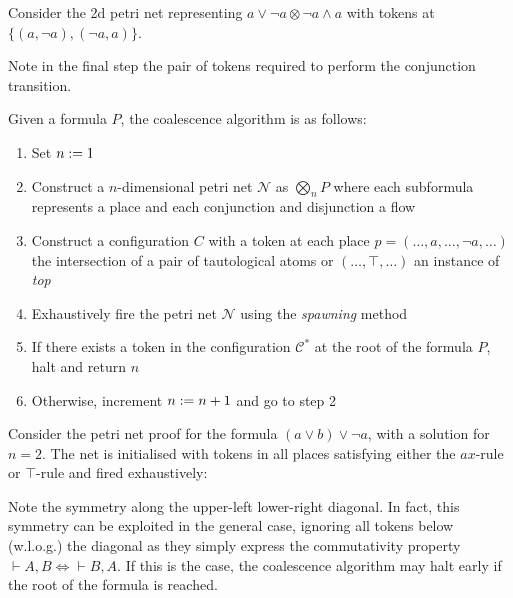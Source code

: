     \begin{example}
        Consider the 2d petri net representing $a \vee \neg a \otimes \neg a \wedge a$ with tokens at $\{(a, \neg a), (\neg a, a)\}$.
        
        Note in the final step the pair of tokens required to perform the conjunction transition.
    \end{example}


    \begin{definition}[Coalescence]
        Given a formula $P$, the coalescence algorithm is as follows:
        \begin{enumerate}[nosep]
            \item Set  $n := 1$
            \item Construct a $n$-dimensional petri net $\mathcal{N}$ as $\bigotimes_n P$ where each subformula represents a place and each conjunction and disjunction a flow
            \item Construct a configuration $C$ with a token at each place $p = (\ldots, a, \ldots, \neg a, \ldots)$ the intersection of a pair of tautological atoms or $(\ldots, \top, \ldots)$ an instance of \textit{top}
            \item Exhaustively fire the petri net $\mathcal{N}$ using the \textit{spawning} method
            \item If there exists a token in the configuration $\mathcal{C^*}$ at the root of the formula $P$, halt and return $n$
            \item Otherwise, increment $n := n + 1$ and go to step 2
        \end{enumerate}
    \end{definition}
    
    \begin{example}
        Consider the petri net proof for the formula $(a \vee b) \vee \neg a$, with a solution for $n = 2$.
        The net is initialised with tokens in all places satisfying either the $ax$-rule or $\top$-rule and fired exhaustively:
        
    \end{example}

    \begin{remark}\label{sec-ctr:symmetry}
        Note the symmetry along the upper-left lower-right diagonal.
        In fact, this symmetry can be exploited in the general case, ignoring all tokens below (w.l.o.g.) the diagonal as they simply express the commutativity property $\vdash A, B \iff \vdash B, A$.
        If this is the case, the coalescence algorithm may halt early if the root of the formula is reached.
    \end{remark}


